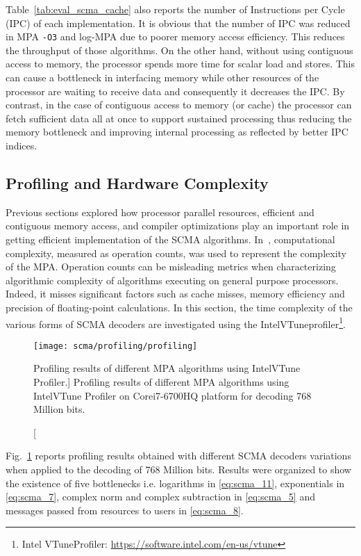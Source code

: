Table~\ref{tab:eval_scma_cache} also reports the number of Instructions per
Cycle (IPC) of each implementation. It is obvious that the number of IPC was
reduced in MPA \verb|-O3| and log-MPA due to poorer memory access efficiency.
This reduces the throughput of those algorithms. On the other hand, without
using contiguous access to memory, the processor spends more time for scalar
load and stores. This can cause a bottleneck in interfacing memory while other
resources of the processor are waiting to receive data and consequently it
decreases the IPC. By contrast, in the case of contiguous access to memory (or
cache) the processor can fetch sufficient data all at once to support sustained
processing thus reducing the memory bottleneck and improving internal processing
as reflected by better IPC indices.

\subsection{Profiling and Hardware Complexity}
\label{sec:eval_scma_profiling}

Previous sections explored how processor parallel resources, efficient and
contiguous memory access, and compiler optimizations play an important role in
getting efficient implementation of the SCMA algorithms. In~\cite{Zhang2014a,
Liu2016,Jia2018,Du2016a}, computational complexity, measured as operation
counts, was used to represent the complexity of the MPA. Operation counts can be
misleading metrics when characterizing algorithmic complexity of algorithms
executing on general purpose processors. Indeed, it misses significant factors
such as cache misses, memory efficiency and precision of floating-point
calculations. In this section, the time complexity of the various forms of SCMA
decoders are investigated using the Intel\R VTune\TM profiler\footnote{Intel\R
VTune\TM Profiler: \url{https://software.intel.com/en-us/vtune}}.

\begin{figure}[htp]
  \centering
  \texttt{[image: scma/profiling/profiling]}
  \caption
    [Profiling results of different MPA algorithms using Intel\R VTune\TM
    Profiler.]
    {Profiling results of different MPA algorithms using Intel\R VTune\TM
    Profiler on Core\TM i7-6700HQ platform for decoding 768 Million bits.}
  \label{plot:eval_scma_profiling}
\end{figure}

Fig.~\ref{plot:eval_scma_profiling} reports profiling results obtained with
different SCMA decoders variations when applied to the decoding of 768 Million
bits. Results were organized to show the existence of five bottlenecks i.e.
logarithms in \eqref{eq:scma_11}, exponentials in \eqref{eq:scma_7}, complex
norm and complex subtraction in \eqref{eq:scma_5} and messages passed from
resources to users in \eqref{eq:scma_8}.

